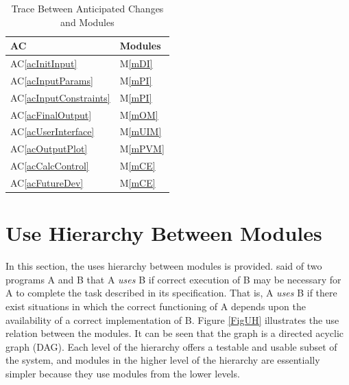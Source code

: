 \documentclass[12pt, titlepage]{article}
\newcommand{\acref}[1]{AC\ref{#1}}
\newcommand{\mref}[1]{M\ref{#1}}
\begin{document}
\begin{table}[H]
\centering
\begin{tabular}{p{} p{}}
\toprule
\textbf{AC} & \textbf{Modules}\\
\midrule
\acref{acInitInput} & \mref{mDI}\\
\acref{acInputParams} & \mref{mPI}\\
\acref{acInputConstraints} & \mref{mPI}\\
\acref{acFinalOutput} & \mref{mOM}\\
\acref{acUserInterface} & \mref{mUIM}\\
\acref{acOutputPlot} & \mref{mPVM}\\
\acref{acCalcControl} & \mref{mCE}\\
\acref{acFutureDev} & \mref{mCE}\\
\bottomrule
\end{tabular}
\caption{Trace Between Anticipated Changes and Modules}
\label{TblACT}
\end{table}

\section{Use Hierarchy Between Modules} \label{SecUse}

In this section, the uses hierarchy between modules is
provided. \citet{Parnas1978} said of two programs A and B that A {\em uses} B if
correct execution of B may be necessary for A to complete the task described in
its specification. That is, A {\em uses} B if there exist situations in which
the correct functioning of A depends upon the availability of a correct
implementation of B.  Figure \ref{FigUH} illustrates the use relation between
the modules. It can be seen that the graph is a directed acyclic graph
(DAG). Each level of the hierarchy offers a testable and usable subset of the
system, and modules in the higher level of the hierarchy are essentially simpler
because they use modules from the lower levels.
\end{document}
